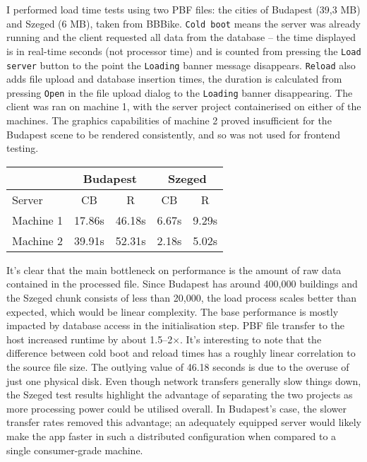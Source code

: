 I performed load time tests using two PBF files: the cities of Budapest (39,3 MB) and Szeged (6 MB), taken from BBBike. \verb|Cold boot| means the server was already running and the client requested all data from the database -- the time displayed is in real-time seconds (not processor time) and is counted from pressing the \verb|Load server| button to the point the \verb|Loading| banner message disappears. \verb|Reload| also adds file upload and database insertion times, the duration is calculated from pressing \verb|Open| in the file upload dialog to the \verb|Loading| banner disappearing. The client was ran on machine 1, with the server project containerised on either of the machines. The graphics capabilities of machine 2 proved insufficient for the Budapest scene to be rendered consistently, and so was not used for frontend testing.

\begin{center}
    \begin{tabular}{l|cc|cc}
        \multicolumn{1}{c}{} & \multicolumn{2}{c}{Budapest} & \multicolumn{2}{c}{Szeged} \\
        \hline
        Server & CB & R & CB & R \\
        \hline
        Machine 1 & 17.86s & 46.18s & 6.67s & 9.29s \\
        Machine 2 & 39.91s & 52.31s & 2.18s & 5.02s \\
        \end{tabular}
\end{center}
It's clear that the main bottleneck on performance is the amount of raw data contained in the processed file. Since Budapest has around 400,000 buildings and the Szeged chunk consists of less than 20,000, the load process scales better than expected, which would be linear complexity. The base performance is mostly impacted by database access in the initialisation step. PBF file transfer to the host increased runtime by about 1.5--2$\times$. It's interesting to note that the difference between cold boot and reload times has a roughly linear correlation to the source file size.
The outlying value of 46.18 seconds is due to the overuse of just one physical disk. Even though network transfers generally slow things down, the Szeged test results highlight the advantage of separating the two projects as more processing power could be utilised overall. In Budapest's case, the slower transfer rates removed this advantage; an adequately equipped server would likely make the app faster in such a distributed configuration when compared to a single consumer-grade machine.

